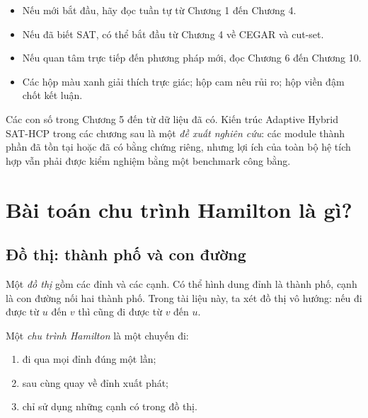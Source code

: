 \documentclass[11pt,a4paper,oneside]{scrreprt}
\begin{document}
\begin{itemize}
  \item Nếu mới bắt đầu, hãy đọc tuần tự từ Chương 1 đến Chương 4.
  \item Nếu đã biết SAT, có thể bắt đầu từ Chương 4 về CEGAR và cut-set.
  \item Nếu quan tâm trực tiếp đến phương pháp mới, đọc Chương 6 đến Chương 10.
  \item Các hộp màu xanh giải thích trực giác; hộp cam nêu rủi ro; hộp viền đậm chốt kết luận.
\end{itemize}

\begin{warningbox}
Các con số trong Chương 5 đến từ dữ liệu đã có. Kiến trúc Adaptive Hybrid SAT-HCP trong các chương sau là một \emph{đề xuất nghiên cứu}: các module thành phần đã tồn tại hoặc đã có bằng chứng riêng, nhưng lợi ích của toàn bộ hệ tích hợp vẫn phải được kiểm nghiệm bằng một benchmark công bằng.
\end{warningbox}

\tableofcontents
\clearpage
{}

\chapter{Bài toán chu trình Hamilton là gì?}

\section{Đồ thị: thành phố và con đường}

Một \emph{đồ thị} gồm các đỉnh và các cạnh. Có thể hình dung đỉnh là thành phố, cạnh là con đường nối hai thành phố. Trong tài liệu này, ta xét đồ thị vô hướng: nếu đi được từ $u$ đến $v$ thì cũng đi được từ $v$ đến $u$.

Một \emph{chu trình Hamilton} là một chuyến đi:

\begin{enumerate}
  \item đi qua mọi đỉnh đúng một lần;
  \item sau cùng quay về đỉnh xuất phát;
  \item chỉ sử dụng những cạnh có trong đồ thị.
\end{enumerate}
\end{document}
